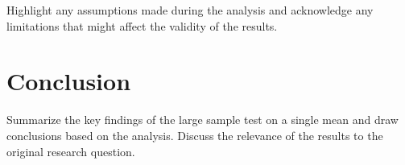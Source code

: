 \documentclass[10pt]{book}
\begin{document}
Highlight any assumptions made during the analysis and acknowledge any limitations that might affect the validity of the results.

\section{Conclusion}

Summarize the key findings of the large sample test on a single mean and draw conclusions based on the analysis. Discuss the relevance of the results to the original research question.














%
%
%
%
%

\newpage
\printbibliography
{}


\newpage
{} %
\printindex
\end{document}
